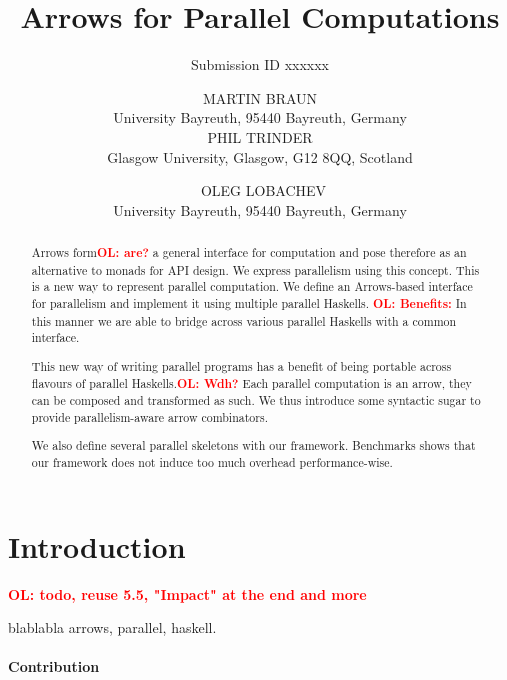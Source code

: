 \documentclass{jfp1}
\title{Arrows for Parallel Computations}
\author{Submission ID xxxxxx}
\author[M. Braun, P. Trinder and O. Lobachev]%
        {MARTIN BRAUN\\
         University Bayreuth, 95440 Bayreuth, Germany\\
         PHIL TRINDER\\
		 Glasgow University, Glasgow, G12 8QQ, Scotland\\
		 \and\ OLEG LOBACHEV\\
		 University Bayreuth, 95440 Bayreuth, Germany}
\newcommand{\citHughes}{\citep{HughesArrows}}
\newcommand{\comm}[2]{\textcolor{red}{\bfseries #1: #2}}
\newcommand{\olcomment}[1]{\comm{OL}{#1}}
\begin{document}
\label{firstpage}

\maketitle

\begin{abstract}
Arrows form\olcomment{are?} a general interface for computation and pose therefore as an alternative to monads for API design. We express parallelism using this concept. This is a new way to represent parallel computation. We define an Arrows-based interface for parallelism and implement it using multiple parallel Haskells.
\olcomment{Benefits:} In this manner we are able to bridge across various parallel Haskells with a common interface.

This new way of writing parallel programs has a benefit of being portable across flavours of parallel Haskells.\olcomment{Wdh?}
Each parallel computation is an arrow, they can be composed and transformed as such.
We thus introduce some syntactic sugar to provide parallelism-aware arrow combinators.

We also define  several parallel skeletons with our framework. 
Benchmarks shows that our framework does not induce too much overhead performance-wise.
\end{abstract}

\tableofcontents

	\tableofcontents

\section{Introduction}
\label{sec:introduction}
\olcomment{todo, reuse 5.5, "Impact" at the end and more}

blablabla arrows, parallel, haskell.

\paragraph{Contribution}
\end{document}

